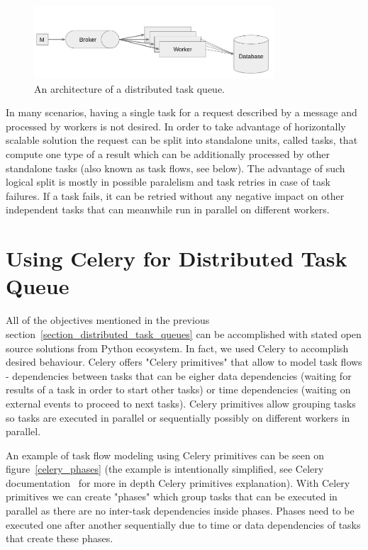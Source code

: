 \documentclass[a4paper]{llncs}
\begin{document}
\begin{figure}
  \centering
  \includegraphics[width=0.8\textwidth]{fig/architecture.png}
  \caption{An architecture of a distributed task queue.}
  \label{architecture}
\end{figure}

In many scenarios, having a single task for a request described by a message and processed by workers is not desired. In order to take advantage of horizontally scalable solution the request can be split into standalone units, called tasks, that compute one type of a result which can be additionally processed by other standalone tasks (also known as task flows, see below). The advantage of such logical split is mostly in possible paralelism and task retries in case of task failures. If a task fails, it can be retried without any negative impact on other independent tasks that can meanwhile run in parallel on different workers.

\section{Using Celery for Distributed Task Queue}

All of the objectives mentioned in the previous section~\ref{section_distributed_task_queues} can be accomplished with stated open source solutions from Python ecosystem. In fact, we used Celery to accomplish desired behaviour. Celery offers "Celery primitives" that allow to model task flows - dependencies between tasks that can be eigher data dependencies (waiting for results of a task in order to start other tasks) or time dependencies (waiting on external events to proceed to next tasks). Celery primitives allow grouping tasks so tasks are executed in parallel or sequentially possibly on different workers in parallel.

An example of task flow modeling using Celery primitives can be seen on figure~\ref{celery_phases} (the example is intentionally simplified, see Celery documentation~\cite{ref_celery_docs} for more in depth Celery primitives explanation). With Celery primitives we can create "phases" which group tasks that can be executed in parallel as there are no inter-task dependencies inside phases. Phases need to be executed one after another sequentially due to time or data dependencies of tasks that create these phases.
\end{document}
